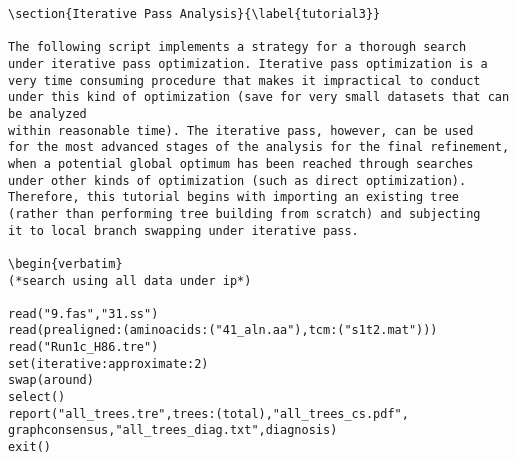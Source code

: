 \begin{verbatim}
\section{Iterative Pass Analysis}{\label{tutorial3}}

The following script implements a strategy for a thorough search
under iterative pass optimization. Iterative pass optimization is a 
very time consuming procedure that makes it impractical to conduct 
under this kind of optimization (save for very small datasets that can be analyzed
within reasonable time). The iterative pass, however, can be used
for the most advanced stages of the analysis for the final refinement,
when a potential global optimum has been reached through searches
under other kinds of optimization (such as direct optimization).
Therefore, this tutorial begins with importing an existing tree
(rather than performing tree building from scratch) and subjecting 
it to local branch swapping under iterative pass.

\begin{verbatim}
(*search using all data under ip*)

read("9.fas","31.ss")
read(prealigned:(aminoacids:("41_aln.aa"),tcm:("s1t2.mat")))
read("Run1c_H86.tre")
set(iterative:approximate:2)
swap(around)
select()
report("all_trees.tre",trees:(total),"all_trees_cs.pdf",
graphconsensus,"all_trees_diag.txt",diagnosis)
exit()
\end{verbatim}

